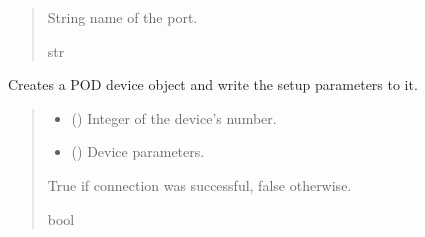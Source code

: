 \documentclass[letterpaper,10pt,english]{sphinxmanual}
\begin{document}
\begin{fulllineitems}
\begin{fulllineitems}
\begin{quote}
\begin{description}
\sphinxAtStartPar
String name of the port.

\sphinxAtStartPar
str

\end{description}\end{quote}

\end{fulllineitems}


\begin{fulllineitems}
\label{\detokenize{Setup_PodInterface:Setup_PodInterface.Setup_Interface._ConnectPODdevice}}
\pysigstartsignatures
{}
\pysigstopsignatures
\sphinxAtStartPar
Creates a POD device object and write the setup parameters to it.
\begin{quote}\begin{description}
\begin{itemize}
\item {} 
\sphinxAtStartPar
{} () \textendash{} Integer of the device’s number.

\item {} 
\sphinxAtStartPar
{} ({\hyperref[\detokenize{Setup_PodParameters:Setup_PodParameters.Params_Interface}]{}}) \textendash{} Device parameters.

\end{itemize}

\sphinxAtStartPar
True if connection was successful, false otherwise.

\sphinxAtStartPar
bool

\end{description}\end{quote}


\end{fulllineitems}
\end{fulllineitems}
\end{document}
